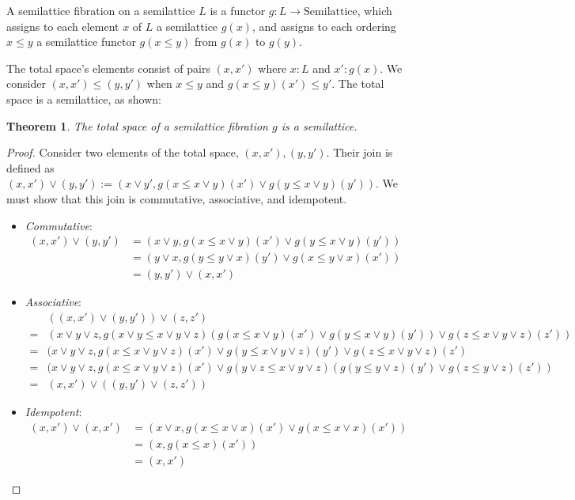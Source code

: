 \documentclass{article}
\newtheorem{theorem}{Theorem}
\begin{document}
      A semilattice fibration on a semilattice $L$ is a functor $g : L \rightarrow \mathrm{Semilattice}$, which assigns to each element $x$ of $L$ a semilattice $g(x)$, and assigns to each ordering $x \leq y$ a semilattice functor $g(x \leq y)$ from $g(x)$ to $g(y)$.

      The total space's elements consist of pairs $(x, x')$ where $x : L$ and $x' : g(x)$. We consider $(x, x') \leq (y, y')$ when $x \leq y$ and $g(x \leq y)(x') \leq y'$. The total space is a semilattice, as shown:

      \begin{theorem}
        The total space of a semilattice fibration $g$ is a semilattice.
      \end{theorem}
      \begin{proof}
        Consider two elements of the total space, $(x, x'), (y, y')$. Their join is defined as $(x, x') \vee (y, y') := (x \vee y', g(x \leq x \vee y)(x') \vee g(y \leq x \vee y)(y'))$. We must show that this join is commutative, associative, and idempotent.
        \begin{itemize}
          \item \emph{Commutative}:
            \begin{align*}
              (x, x') \vee (y, y') &= (x \vee y, g(x \leq x \vee y)(x') \vee g(y \leq x \vee y)(y')) \\
              &= (y \vee x, g(y \leq y \vee x)(y') \vee g(x \leq y \vee x)(x')) \\
              &= (y, y') \vee (x, x')
            \end{align*}
          \item \emph{Associative}:
            \begin{align*} &((x, x') \vee (y, y')) \vee (z, z')  \\
              =& (x \vee y \vee z, g(x \vee y \leq x \vee y \vee z)(g(x \leq x \vee y)(x') \vee g(y \leq x \vee y)(y')) \vee g(z \leq x \vee y \vee z)(z')) \\
              =& (x \vee y \vee z, g(x \leq x \vee y \vee z)(x') \vee g(y \leq x \vee y \vee z)(y') \vee g(z \leq x \vee y \vee z)(z') \\
              =& (x \vee y \vee z, g(x \leq x \vee y \vee z)(x') \vee g(y \vee z \leq x \vee y \vee z)(g(y \leq y \vee z)(y') \vee g(z \leq y \vee z)(z')) \\
              =& (x, x') \vee ((y, y') \vee (z, z'))
            \end{align*}
          \item \emph{Idempotent}: 
            \begin{align*}
              (x, x') \vee (x, x') &= (x \vee x, g(x \leq x \vee x)(x') \vee g(x \leq x \vee x)(x')) \\
              &= (x, g(x \leq x)(x')) \\
              &= (x, x')
            \end{align*}
        \end{itemize}
      \end{proof}
\end{document}
